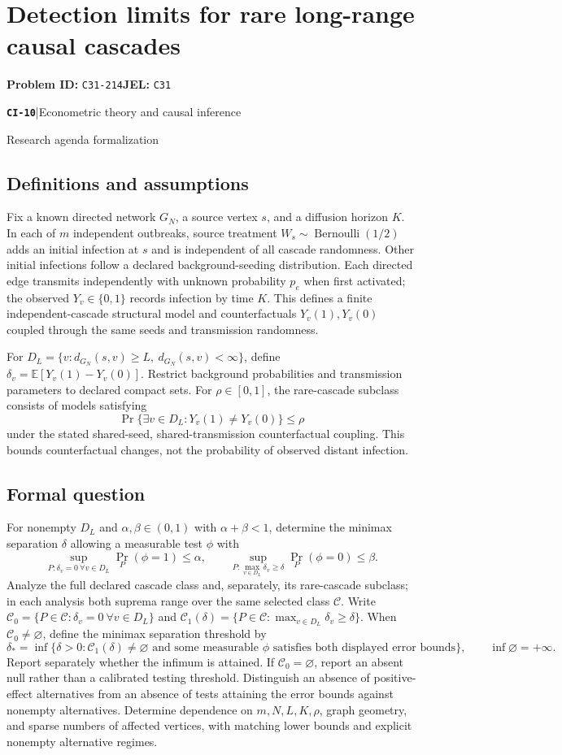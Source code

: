 \documentclass[11pt,a4paper]{article}
\newcommand{\E}{\mathbb E}
\newcommand{\entrymeta}[3]{{\sffamily\small\color{muted}\textbf{\texttt{#1}}\quad|\quad #2\par #3\par}}
\begin{document}
\section*{Detection limits for rare long-range causal cascades}
\textbf{Problem ID:} \texttt{C31-214}\quad \textbf{JEL:} \texttt{C31}\par
\label{problem:OP-0489}
\label{beyond:CI-10}
\entrymeta{CI-10}{Econometric theory and causal inference}{Research agenda formalization}
\subsection*{Definitions and assumptions}
Fix a known directed network $G_N$, a source vertex $s$, and a diffusion horizon $K$. In each of $m$ independent outbreaks, source treatment $W_s\sim\operatorname{Bernoulli}(1/2)$ adds an initial infection at $s$ and is independent of all cascade randomness. Other initial infections follow a declared background-seeding distribution. Each directed edge transmits independently with unknown probability $p_e$ when first activated; the observed $Y_v\in\{0,1\}$ records infection by time $K$. This defines a finite independent-cascade structural model and counterfactuals $Y_v(1),Y_v(0)$ coupled through the same seeds and transmission randomness.

For $D_L=\{v:d_{G_N}(s,v)\geq L,\ d_{G_N}(s,v)<\infty\}$, define $\delta_v=\E[Y_v(1)-Y_v(0)]$. Restrict background probabilities and transmission parameters to declared compact sets. For $\rho\in[0,1]$, the rare-cascade subclass consists of models satisfying
\[
 \Pr\{\exists v\in D_L:Y_v(1)\ne Y_v(0)\}\leq\rho
\]
under the stated shared-seed, shared-transmission counterfactual coupling. This bounds counterfactual changes, not the probability of observed distant infection.
\subsection*{Formal question}
For nonempty $D_L$ and $\alpha,\beta\in(0,1)$ with $\alpha+\beta<1$, determine the minimax separation $\delta$ allowing a measurable test $\phi$ with
\[
\sup_{P:\delta_v=0\ \forall v\in D_L}\Pr_P(\phi=1)\leq\alpha,
\qquad
\sup_{P:\max_{v\in D_L}\delta_v\geq\delta}\Pr_P(\phi=0)\leq\beta.
\]
Analyze the full declared cascade class and, separately, its rare-cascade subclass; in each analysis both suprema range over the same selected class $\mathcal C$. Write $\mathcal C_0=\{P\in\mathcal C:\delta_v=0\ \forall v\in D_L\}$ and $\mathcal C_1(\delta)=\{P\in\mathcal C:\max_{v\in D_L}\delta_v\geq\delta\}$. When $\mathcal C_0\ne\varnothing$, define the minimax separation threshold by
\[
 \delta_*=\inf\{\delta>0:\mathcal C_1(\delta)\ne\varnothing
   \text{ and some measurable }\phi\text{ satisfies both displayed error bounds}\},
 \qquad \inf\varnothing=+\infty.
\]
Report separately whether the infimum is attained. If $\mathcal C_0=\varnothing$, report an absent null rather than a calibrated testing threshold. Distinguish an absence of positive-effect alternatives from an absence of tests attaining the error bounds against nonempty alternatives. Determine dependence on $m,N,L,K,\rho$, graph geometry, and sparse numbers of affected vertices, with matching lower bounds and explicit nonempty alternative regimes.
\end{document}
